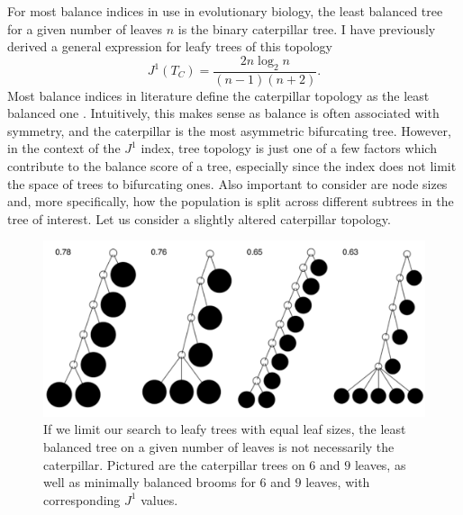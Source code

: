 For most balance indices in use in evolutionary biology, the least balanced tree
for a given number of leaves $n$ is the binary caterpillar tree. I have
previously derived a general expression for leafy trees of this topology
\citep{lemant_robust_2022}
\begin{equation}
    J^1(T_C) = \frac{2n\log_2n}{(n-1)(n+2)}.\label{caterpillar}
\end{equation}
Most balance indices in literature define the caterpillar topology as the least
balanced one \citep{fischer_tree_2021}. Intuitively, this makes sense as balance
is often associated with symmetry, and the caterpillar is the most asymmetric
bifurcating tree. However, in the context of the $J^1$ index, tree topology is
just one of a few factors which contribute to the balance score of a tree,
especially since the index does not limit the space of trees to bifurcating ones.
Also important to consider are node sizes and, more specifically, how the population
is split across different subtrees in the tree of interest. Let us consider a
slightly altered caterpillar topology. \par

\begin{figure}[h]
    \centering
    \includegraphics[width=\textwidth]{Chapter_2/figures/example_figure_1.pdf}
    \caption{If we limit our search to leafy trees with equal leaf sizes, the
    least balanced tree on a given number of leaves is not necessarily the
    caterpillar. Pictured are the caterpillar trees on $6$ and $9$ leaves, as
    well as minimally balanced brooms for $6$ and $9$ leaves,
    with corresponding $J^1$ values.}
    \label{example_figure_1}
\end{figure}

